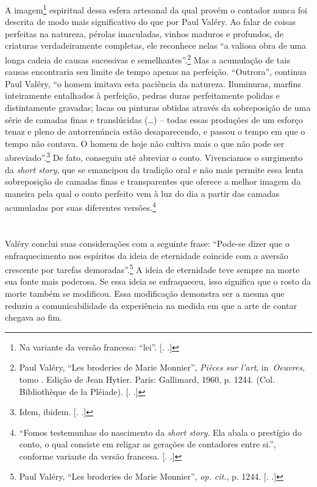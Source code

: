 A imagem\footnote{Na variante da versão francesa: ``lei''. [. 
.]} espiritual dessa esfera artesanal da qual provém o contador
nunca foi descrita de modo mais significativo do que por Paul Valéry. Ao
falar de coisas perfeitas na natureza, pérolas imaculadas, vinhos
maduros e profundos, de criaturas verdadeiramente completas, ele
reconhece nelas ``a valiosa obra de uma longa cadeia de causas
sucessivas e semelhantes''.\footnote{Paul Valéry, ``Les broderies de
  Marie Monnier'', \emph{Pièces sur l'art}, in~\emph{Oeuvres}, tomo .
  Edição de Jean Hytier. Paris: Gallimard, 1960, p. 1244. (Col.
  Bibliothèque de la Pléiade). [. .]} Mas a acumulação de tais
causas encontraria seu limite de tempo apenas na perfeição. ``Outrora'',
continua Paul Valéry, ``o homem imitava esta paciência da natureza.
Iluminuras, marfins inteiramente entalhados à perfeição, pedras duras
perfeitamente polidas e distintamente gravadas; lacas ou pinturas
obtidas através da sobreposição de uma série de camadas finas e
translúcidas (\ldots{}) -- todas essas produções de um esforço tenaz e pleno
de autorrenúncia estão desaparecendo, e passou o tempo em que o tempo
não contava. O homem de hoje não cultiva mais o que não pode ser
abreviado''.\footnote{Idem, ibidem. [. .]} De fato, conseguiu
até abreviar o conto. Vivenciamos o surgimento da \emph{short story},
que se emancipou da tradição oral e não mais permite essa lenta
sobreposição de camadas finas e transparentes que oferece a melhor
imagem da maneira pela qual o conto perfeito vem à luz do dia a partir
das camadas acumuladas por suas diferentes versões\label{supra7}.\footnote{``Fomos
  testemunhas do nascimento da \emph{short story}. Ela abala o prestígio
  do conto, o qual consiste em religar as gerações de contadores entre
  si.'', conforme variante da versão francesa. [. .]}

\section{}

Valéry conclui suas considerações com a seguinte frase: ``Pode-se dizer
que o enfraquecimento nos espíritos da ideia de eternidade coincide com
a aversão crescente por tarefas demoradas''.\footnote{Paul Valéry, ``Les
  broderies de Marie Monnier'', \emph{op. cit.}, p. 1244. [. .]}
A ideia de eternidade teve sempre na morte sua fonte mais poderosa. Se
essa ideia se enfraqueceu, isso significa que o rosto da morte também se
modificou. Essa modificação demonstra ser a mesma que reduziu a
comunicabilidade da experiência na medida em que a arte de contar
chegava ao fim.


